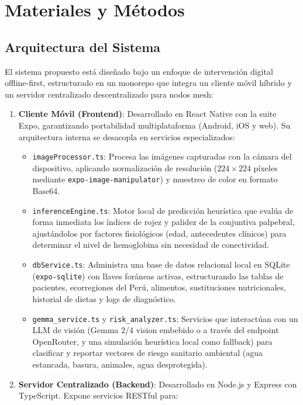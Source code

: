 \section{Materiales y Métodos}
\label{sec:materiales_metodos}

\subsection{Arquitectura del Sistema}
\label{sec:arquitectura}

El sistema propuesto está diseñado bajo un enfoque de intervención digital offline-first, estructurado en un monorepo que integra un cliente móvil híbrido y un servidor centralizado descentralizado para nodos mesh:

\begin{enumerate}
    \item \textbf{Cliente Móvil (Frontend)}: Desarrollado en React Native con la suite Expo, garantizando portabilidad multiplataforma (Android, iOS y web). Su arquitectura interna se desacopla en servicios especializados:
    \begin{itemize}
        \item \texttt{imageProcessor.ts}: Procesa las imágenes capturadas con la cámara del dispositivo, aplicando normalización de resolución ($224 \times 224$ píxeles mediante \texttt{expo-image-manipulator}) y muestreo de color en formato Base64.
        \item \texttt{inferenceEngine.ts}: Motor local de predicción heurística que evalúa de forma inmediata los índices de rojez y palidez de la conjuntiva palpebral, ajustándolos por factores fisiológicos (edad, antecedentes clínicos) para determinar el nivel de hemoglobina sin necesidad de conectividad.
        \item \texttt{dbService.ts}: Administra una base de datos relacional local en SQLite (\texttt{expo-sqlite}) con llaves foráneas activas, estructurando las tablas de pacientes, ecorregiones del Perú, alimentos, sustituciones nutricionales, historial de dietas y logs de diagnóstico.
        \item \texttt{gemma\_service.ts} y \texttt{risk\_analyzer.ts}: Servicios que interactúan con un LLM de visión (Gemma 2/4 vision embebido o a través del endpoint OpenRouter, y una simulación heurística local como fallback) para clasificar y reportar vectores de riesgo sanitario ambiental (agua estancada, basura, animales, agua desprotegida).
    \end{itemize}
    \item \textbf{Servidor Centralizado (Backend)}: Desarrollado en Node.js y Express con TypeScript. Expone servicios RESTful para:

\end{enumerate}

